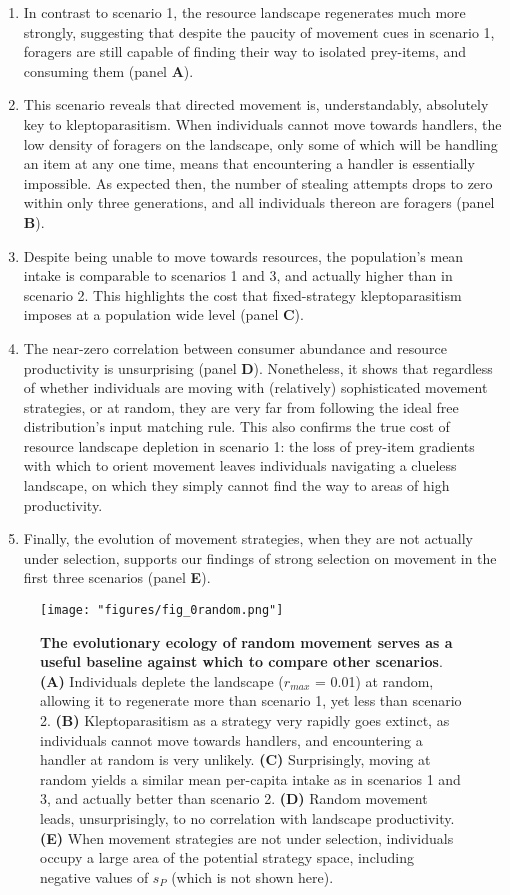 \documentclass[]{article}
\begin{document}
\begin{enumerate}
\def\labelenumi{\arabic{enumi}.}
\item
  In contrast to scenario 1, the resource landscape regenerates much more strongly, suggesting that despite the paucity of movement cues in scenario 1, foragers are still capable of finding their way to isolated prey-items, and consuming them (panel \textbf{A}).
\item
  This scenario reveals that directed movement is, understandably, absolutely key to kleptoparasitism.
  When individuals cannot move towards handlers, the low density of foragers on the landscape, only some of which will be handling an item at any one time, means that encountering a handler is essentially impossible.
  As expected then, the number of stealing attempts drops to zero within only three generations, and all individuals thereon are foragers (panel \textbf{B}).
\item
  Despite being unable to move towards resources, the population's mean intake is comparable to scenarios 1 and 3, and actually higher than in scenario 2.
  This highlights the cost that fixed-strategy kleptoparasitism imposes at a population wide level (panel \textbf{C}).
\item
  The near-zero correlation between consumer abundance and resource productivity is unsurprising (panel \textbf{D}).
  Nonetheless, it shows that regardless of whether individuals are moving with (relatively) sophisticated movement strategies, or at random, they are very far from following the ideal free distribution's input matching rule.
  This also confirms the true cost of resource landscape depletion in scenario 1: the loss of prey-item gradients with which to orient movement leaves individuals navigating a clueless landscape, on which they simply cannot find the way to areas of high productivity.
\item
  Finally, the evolution of movement strategies, when they are not actually under selection, supports our findings of strong selection on movement in the first three scenarios (panel \textbf{E}).
\end{enumerate}

\begin{figure}
\centering
\texttt{[image: "figures/fig\_0random.png"]}
\caption{\textbf{The evolutionary ecology of random movement serves as a useful baseline against which to compare other scenarios}. \textbf{(A)} Individuals deplete the landscape (\(r_{max}\) = 0.01) at random, allowing it to regenerate more than scenario 1, yet less than scenario 2. \textbf{(B)} Kleptoparasitism as a strategy very rapidly goes extinct, as individuals cannot move towards handlers, and encountering a handler at random is very unlikely. \textbf{(C)} Surprisingly, moving at random yields a similar mean per-capita intake as in scenarios 1 and 3, and actually better than scenario 2. \textbf{(D)} Random movement leads, unsurprisingly, to no correlation with landscape productivity. \textbf{(E)} When movement strategies are not under selection, individuals occupy a large area of the potential strategy space, including negative values of \(s_P\) (which is not shown here).}
\end{figure}
\end{document}

